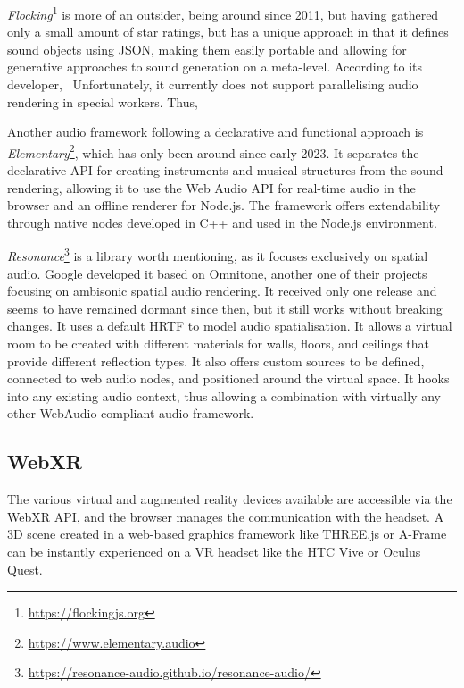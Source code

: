 \emph{Flocking}\footnote{\url{https://flockingjs.org}} is more of an outsider, being around since 2011, but having gathered only a small amount of star ratings, but has a unique approach in that it defines sound objects using \ac{JSON}, making them easily portable and allowing for generative approaches to sound generation on a meta-level.
According to its developer,~ Unfortunately, it currently does not support parallelising audio rendering in special workers. Thus,~

Another audio framework following a declarative and functional approach is \emph{Elementary}\footnote{\url{https://www.elementary.audio}}, which has only been around since early 2023.
It separates the declarative \ac{API} for creating instruments and musical structures from the sound rendering, allowing it to use the Web Audio \ac{API} for real-time audio in the browser and an offline renderer for Node.js.
The framework offers extendability through native nodes developed in C++ and used in the Node.js environment.

\emph{Resonance}\footnote{\url{https://resonance-audio.github.io/resonance-audio/}} is a library worth mentioning, as it focuses exclusively on spatial audio.
Google developed it based on Omnitone, another one of their projects focusing on ambisonic spatial audio rendering.
It received only one release and seems to have remained dormant since then, but it still works without breaking changes.
It uses a default \ac{HRTF} to model audio spatialisation.
It allows a virtual room to be created with different materials for walls, floors, and ceilings that provide different reflection types.
It also offers custom sources to be defined, connected to web audio nodes, and positioned around the virtual space.
It hooks into any existing audio context, thus allowing a combination with virtually any other WebAudio-compliant audio framework.

\subsection{WebXR}

The various virtual and augmented reality devices available are accessible via the WebXR \ac{API}, and the browser manages the communication with the headset. A \ac{3D} scene created in a web-based graphics framework like THREE.js or A-Frame can be instantly experienced on a \ac{VR} headset like the HTC Vive or Oculus Quest.

